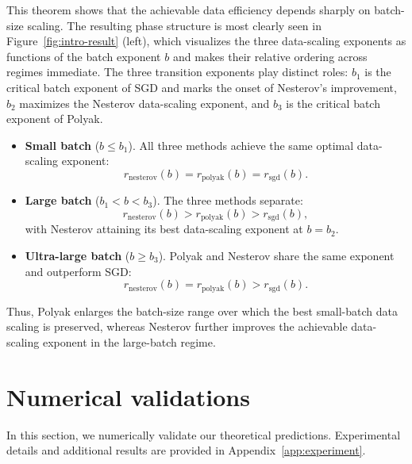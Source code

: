 \documentclass[11pt]{article}
\newcommand{\sgd}{\mathrm{sgd}}
\newcommand{\polyak}{\mathrm{polyak}}
\newcommand{\nesterov}{\mathrm{nesterov}}
\begin{document}
This theorem shows that the achievable data efficiency depends sharply on batch-size scaling. The resulting phase structure is most clearly seen in Figure~\ref{fig:intro-result} (left), which visualizes the three data-scaling exponents as functions of the batch exponent \(b\) and makes their relative ordering across regimes immediate. The three transition exponents play distinct roles: \(b_1\) is the critical batch exponent of SGD and marks the onset of Nesterov's improvement, \(b_2\) maximizes the Nesterov data-scaling exponent, and \(b_3\) is the critical batch exponent of Polyak.

\begin{itemize}
\item \textbf{Small batch} (\(b\leq b_1\)). All three methods achieve the same optimal data-scaling exponent:
\[
r_{\nesterov}(b)=r_{\polyak}(b)=r_{\sgd}(b).
\]

\item \textbf{Large batch} (\(b_1<b<b_3\)). The three methods separate:
\[
r_{\nesterov}(b)>r_{\polyak}(b)>r_{\sgd}(b),
\]
with Nesterov attaining its best data-scaling exponent at \(b=b_2\).

\item \textbf{Ultra-large batch} (\(b\geq b_3\)). Polyak and Nesterov share the same exponent and outperform SGD:
\[
r_{\nesterov}(b)=r_{\polyak}(b)>r_{\sgd}(b).
\]
\end{itemize}

Thus, Polyak enlarges the batch-size range over which the best small-batch  data scaling is preserved, whereas Nesterov further improves the achievable data-scaling exponent in the large-batch regime.




\section{Numerical validations}
\label{sec:experiment}

In this section, we numerically validate our theoretical predictions.
Experimental details and additional results are provided in Appendix~\ref{app:experiment}.
\end{document}
